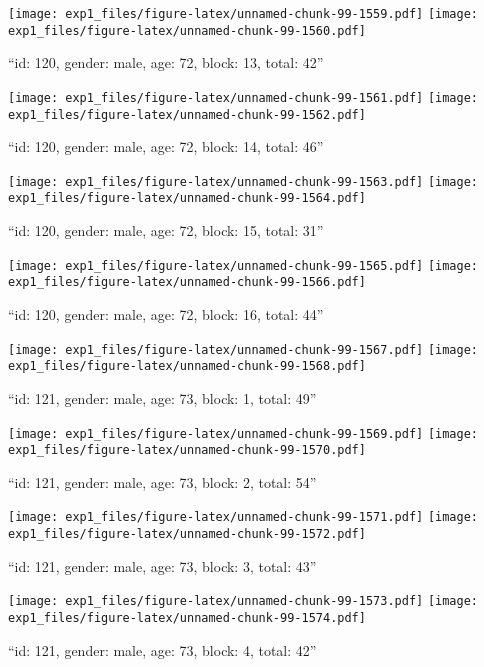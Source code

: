 \documentclass[,]{article}
\begin{document}
\texttt{[image: exp1\_files/figure-latex/unnamed-chunk-99-1559.pdf]}
\texttt{[image: exp1\_files/figure-latex/unnamed-chunk-99-1560.pdf]}

\newpage
[1] 

``id: 120, gender: male, age: 72, block: 13, total: 42''

\texttt{[image: exp1\_files/figure-latex/unnamed-chunk-99-1561.pdf]}
\texttt{[image: exp1\_files/figure-latex/unnamed-chunk-99-1562.pdf]}

\newpage
[1] 

``id: 120, gender: male, age: 72, block: 14, total: 46''

\texttt{[image: exp1\_files/figure-latex/unnamed-chunk-99-1563.pdf]}
\texttt{[image: exp1\_files/figure-latex/unnamed-chunk-99-1564.pdf]}

\newpage
[1] 

``id: 120, gender: male, age: 72, block: 15, total: 31''

\texttt{[image: exp1\_files/figure-latex/unnamed-chunk-99-1565.pdf]}
\texttt{[image: exp1\_files/figure-latex/unnamed-chunk-99-1566.pdf]}

\newpage
[1] 

``id: 120, gender: male, age: 72, block: 16, total: 44''

\texttt{[image: exp1\_files/figure-latex/unnamed-chunk-99-1567.pdf]}
\texttt{[image: exp1\_files/figure-latex/unnamed-chunk-99-1568.pdf]}

\newpage
[1] 

``id: 121, gender: male, age: 73, block: 1, total: 49''

\texttt{[image: exp1\_files/figure-latex/unnamed-chunk-99-1569.pdf]}
\texttt{[image: exp1\_files/figure-latex/unnamed-chunk-99-1570.pdf]}

\newpage
[1] 

``id: 121, gender: male, age: 73, block: 2, total: 54''

\texttt{[image: exp1\_files/figure-latex/unnamed-chunk-99-1571.pdf]}
\texttt{[image: exp1\_files/figure-latex/unnamed-chunk-99-1572.pdf]}

\newpage
[1] 

``id: 121, gender: male, age: 73, block: 3, total: 43''

\texttt{[image: exp1\_files/figure-latex/unnamed-chunk-99-1573.pdf]}
\texttt{[image: exp1\_files/figure-latex/unnamed-chunk-99-1574.pdf]}

\newpage
[1] 

``id: 121, gender: male, age: 73, block: 4, total: 42''
\end{document}

